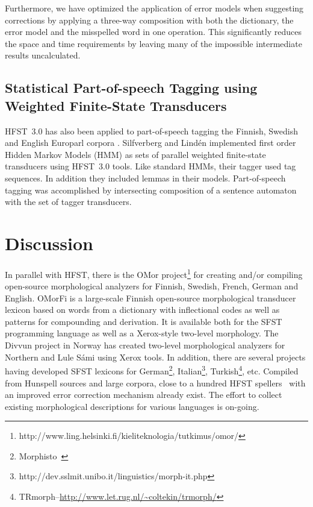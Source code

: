 \documentclass{llncs}
\begin{document}
Furthermore, we have optimized the application of error models when suggesting corrections
by applying a three-way composition with both the dictionary, the error model and the misspelled word in
one operation. This significantly reduces the space and time requirements by leaving many of the impossible
intermediate results uncalculated.

\subsection{Statistical Part-of-speech Tagging using Weighted Finite-State Transducers}
HFST~3.0 has also been applied to part-of-speech tagging the Finnish, Swedish
and English Europarl corpora \cite{silfverberg/2010}. Silfverberg and
Lind\'{e}n implemented first order Hidden Markov Models (HMM) as sets
of parallel weighted finite-state transducers using HFST~3.0 tools. Like
standard HMMs, their tagger used tag sequences. In addition they
included lemmas in their models. Part-of-speech tagging was
accomplished by intersecting composition of a sentence automaton with
the set of tagger transducers.

\section{Discussion}\label{hfst:discussion}
In parallel with HFST, there is the OMor 
project\footnote{http://www.ling.helsinki.fi/kieliteknologia/tutkimus/omor/} for 
creating and/or compiling open-source morphological analyzers for Finnish, Swedish, 
French, German and English. OMorFi is a large-scale Finnish open-source morphological 
transducer lexicon based on words from a dictionary with inflectional codes as well as 
patterns for compounding and derivation. It is available both for the SFST programming 
language as well as a Xerox-style two-level morphology. The Divvun project in Norway 
has created two-level morphological analyzers for Northern and Lule Sámi using 
Xerox tools. In addition, there are several projects having developed SFST lexicons for 
German\footnote{Morphisto~\cite{zielinski/2009}}, 
Italian\footnote{http://dev.sslmit.unibo.it/linguistics/morph-it.php}, Turkish\footnote{TRmorph--\url{http://www.let.rug.nl/~coltekin/trmorph/}}, etc. 
Compiled from Hunspell sources and large corpora, close to a hundred HFST 
spellers~\cite{pirinen/2010/cla} with an improved error correction mechanism 
already exist. The effort to collect existing morphological descriptions
for various languages is on-going.
\end{document}
